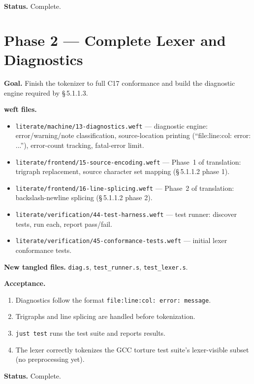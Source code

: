 \documentclass[11pt,a4paper,twoside,openright,DIV=15]{scrbook}
\theoremstyle{definition}
\theoremstyle{plain}
\theoremstyle{remark}
\newcommand{\stdref}[1]{\S\,#1}
\begin{document}
\textbf{Status.} Complete.

\section{Phase 2 --- Complete Lexer and Diagnostics}
\label{sec:phase2}

\textbf{Goal.}  Finish the tokenizer to full C17 conformance and
build the diagnostic engine required by \stdref{5.1.1.3}.

\textbf{weft files.}
\begin{itemize}
\item \texttt{literate/machine/13-diagnostics.weft} ---
      diagnostic engine: error/warning/note classification,
      source-location printing (``file:line:col: error: ...''),
      error-count tracking, fatal-error limit.
\item \texttt{literate/frontend/15-source-encoding.weft} ---
      Phase~1 of translation: trigraph replacement, source
      character set mapping (\stdref{5.1.1.2} phase 1).
\item \texttt{literate/frontend/16-line-splicing.weft} ---
      Phase~2 of translation: backslash-newline splicing
      (\stdref{5.1.1.2} phase 2).
\item \texttt{literate/verification/44-test-harness.weft} ---
      test runner: discover tests, run each, report pass/fail.
\item \texttt{literate/verification/45-conformance-tests.weft} ---
      initial lexer conformance tests.
\end{itemize}

\textbf{New tangled files.}
\texttt{diag.s}, \texttt{test\_runner.s}, \texttt{test\_lexer.s}.

\textbf{Acceptance.}
\begin{enumerate}
\item Diagnostics follow the format
      \texttt{file:line:col: error: message}.
\item Trigraphs and line splicing are handled before tokenization.
\item \texttt{just test} runs the test suite and reports results.
\item The lexer correctly tokenizes the GCC torture test suite's
      lexer-visible subset (no preprocessing yet).
\end{enumerate}

\textbf{Status.} Complete.

\end{document}
